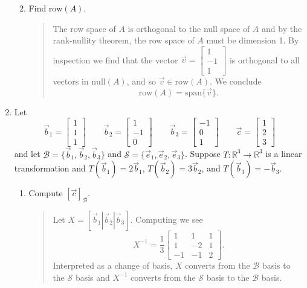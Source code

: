 \documentclass[letter]{article}
\newcommand{\R}{\mathbb{R}}
\newcommand{\Span}{\mathrm{span}}
\newcommand{\Null}{\mathrm{null}}
\newcommand{\mat}[1]{\begin{bmatrix}#1\end{bmatrix}}
\begin{document}
\begin{enumerate}
\begin{enumerate}
\begin{quote}
\[						\]
					\end{quote}
				\item Find $\text{row}(A)$.
					\begin{quote}
						The row space of $A$ is orthogonal to the null space of $A$ and by the
						rank-nullity theorem, the row space of $A$ must be dimension 1.  By inspection
						we find that the vector $\vec v=\mat{1\\-1\\1}$ is orthogonal to all vectors
						in $\Null(A)$, and so $\vec v\in\mathrm{row}(A)$.  
						We conclude
						\[
							\mathrm{row}(A)=\Span\{\vec v\}.
						\]
					\end{quote}
			\end{enumerate}
		
		\item Let
			\[
				\vec b_1=\mat{1\\1\\1}\qquad\vec b_2=\mat{1\\-1\\0}\qquad
				\vec b_3=\mat{-1\\0\\1}\qquad \vec c=\mat{1\\2\\3}
			\]
			and let $\mathcal B=\{\vec b_1,\vec b_2,\vec b_3\}$ and $\mathcal S=\{\vec e_1,\vec e_2,\vec e_3\}$.
			Suppose $T:\R^3\to\R^3$ is a linear transformation and $T(\vec b_1)=2\vec b_1$, 
			$T(\vec b_2)=3\vec b_2$, and $T(\vec b_3)=-\vec b_3$.
			\begin{enumerate}
				\item Compute $[\vec c]_{\mathcal B}$.
					\begin{quote}
						Let $X=[\vec b_1|\vec b_2|\vec b_3]$.  Computing we see
						\[
							X^{-1} = \frac{1}{3}\mat{1&1&1\\1&-2&1\\-1&-1&2}.
						\]
						Interpreted as a change of basis, $X$ converts from the $\mathcal B$
						basis
						to the $\mathcal S$ basis and $X^{-1}$ converts from the $\mathcal S$
						basis to the $\mathcal B$ basis.


\end{quote}
\end{enumerate}
\end{enumerate}
\end{document}
